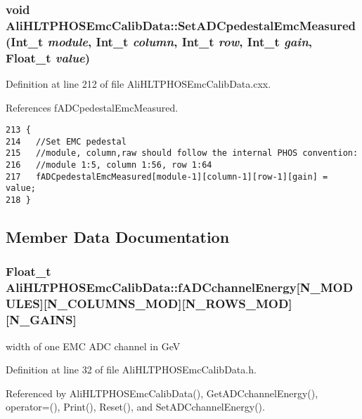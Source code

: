 \subsubsection{\setlength{\rightskip}{0pt plus 5cm}void Ali\-HLTPHOSEmc\-Calib\-Data::Set\-ADCpedestal\-Emc\-Measured (Int\_\-t {\em module}, Int\_\-t {\em column}, Int\_\-t {\em row}, Int\_\-t {\em gain}, Float\_\-t {\em value})}\label{classAliHLTPHOSEmcCalibData_AliHLTPHOSEmcCalibDataa10}




Definition at line 212 of file Ali\-HLTPHOSEmc\-Calib\-Data.cxx.

References f\-ADCpedestal\-Emc\-Measured.

\footnotesize\begin{verbatim}213 {
214   //Set EMC pedestal
215   //module, column,raw should follow the internal PHOS convention:
216   //module 1:5, column 1:56, row 1:64
217   fADCpedestalEmcMeasured[module-1][column-1][row-1][gain] = value;
218 }
\end{verbatim}\normalsize 




\subsection{Member Data Documentation}
\subsubsection{\setlength{\rightskip}{0pt plus 5cm}Float\_\-t {\bf Ali\-HLTPHOSEmc\-Calib\-Data::f\-ADCchannel\-Energy}[N\_\-MODULES][N\_\-COLUMNS\_\-MOD][N\_\-ROWS\_\-MOD][N\_\-GAINS]\hspace{0.3cm}{\tt  [protected]}}\label{classAliHLTPHOSEmcCalibData_AliHLTPHOSEmcCalibDatap0}


width of one EMC ADC channel in Ge\-V 

Definition at line 32 of file Ali\-HLTPHOSEmc\-Calib\-Data.h.

Referenced by Ali\-HLTPHOSEmc\-Calib\-Data(), Get\-ADCchannel\-Energy(), operator=(), Print(), Reset(), and Set\-ADCchannel\-Energy().
